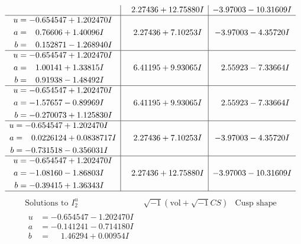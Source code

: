 \documentclass[1p]{elsarticle_modified}
\theoremstyle{definition}
\newcommand{\I}{\sqrt{-1}}
\begin{document}
$$\begin{array}{c|c|c}
 & \phantom{-}2.27436 + 12.75880 I & -3.97003 - 10.31609 I \\ \hline\begin{aligned}
u &= -0.654547 + 1.202470 I \\
a &= \phantom{-}0.76606 + 1.40096 I \\
b &= \phantom{-}0.152871 - 1.268940 I\end{aligned}
 & \phantom{-}2.27436 + 7.10253 I & -3.97003 - 4.35720 I \\ \hline\begin{aligned}
u &= -0.654547 + 1.202470 I \\
a &= \phantom{-}1.00141 + 1.33815 I \\
b &= \phantom{-}0.91938 - 1.48492 I\end{aligned}
 & \phantom{-}6.41195 + 9.93065 I & \phantom{-}2.55923 - 7.33664 I \\ \hline\begin{aligned}
u &= -0.654547 + 1.202470 I \\
a &= -1.57657 - 0.89969 I \\
b &= -0.270073 + 1.125830 I\end{aligned}
 & \phantom{-}6.41195 + 9.93065 I & \phantom{-}2.55923 - 7.33664 I \\ \hline\begin{aligned}
u &= -0.654547 + 1.202470 I \\
a &= \phantom{-}0.0226124 + 0.0838717 I \\
b &= -0.731518 - 0.356031 I\end{aligned}
 & \phantom{-}2.27436 + 7.10253 I & -3.97003 - 4.35720 I \\ \hline\begin{aligned}
u &= -0.654547 + 1.202470 I \\
a &= -1.08160 - 1.86803 I \\
b &= -0.39415 + 1.36343 I\end{aligned}
 & \phantom{-}2.27436 + 12.75880 I & -3.97003 - 10.31609 I\\
 \hline 
 \end{array}$$\newpage$$\begin{array}{c|c|c}  
\text{Solutions to }I^u_{2}& \I (\text{vol} + \sqrt{-1}CS) & \text{Cusp shape}\\
 \hline 
\begin{aligned}
u &= -0.654547 - 1.202470 I \\
a &= -0.141241 - 0.714180 I \\
b &= \phantom{-}1.46294 + 0.00954 I\end{aligned}

\end{array}$$
\end{document}
